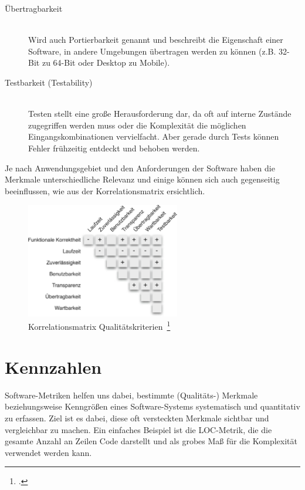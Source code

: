 \begin{description}
\begin{description}
    \item[Übertragbarkeit] \hfill \\ Wird auch Portierbarkeit genannt und beschreibt die Eigenschaft einer Software, in andere Umgebungen übertragen werden zu können (z.B. 32-Bit zu 64-Bit oder Desktop zu Mobile).
    \item[Testbarkeit (Testability)] \hfill \\ Testen stellt eine große Herausforderung dar, da oft auf interne Zustände zugegriffen werden muss oder die Komplexität die möglichen Eingangskombinationen vervielfacht. Aber gerade durch Tests können Fehler frühzeitig entdeckt und behoben werden.
  \end{description}
\end{description}

Je nach Anwendungsgebiet und den Anforderungen der Software haben die Merkmale unterschiedliche Relevanz und einige können sich auch gegenseitig beeinflussen, wie aus der Korrelationsmatrix ersichtlich.

\begin{savenotes}
  \begin{figure}[H] 
    \centering
       \includegraphics[width=0.6\textwidth]{img/korrelationsmatrix-kriterien.png}
    \caption[Korrelationsmatrix Qualitätskriterien]{Korrelationsmatrix Qualitätskriterien~\footcite[][S. 11, Abb. 1.3]{hoffmann_software_qualitat_2013}}\label{fig:Korrelationsmatrix Qualitätskriterien}
  \end{figure}
\end{savenotes}

\newpage
\section{Kennzahlen}

Software-Metriken helfen uns dabei, bestimmte (Qualitäts-) Merkmale beziehungsweise Kenngrößen eines Software-Systems systematisch und quantitativ zu erfassen.
Ziel ist es dabei, diese oft versteckten Merkmale sichtbar und vergleichbar zu machen.
Ein einfaches Beispiel ist die \ac{LOC}-Metrik, die die gesamte Anzahl an Zeilen Code darstellt und als grobes Maß für die Komplexität verwendet werden kann.

